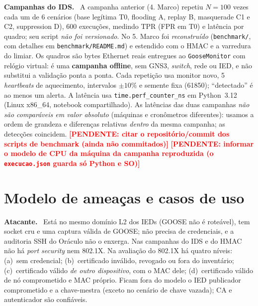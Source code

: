 \documentclass[12pt]{article}
\renewcommand{\paragraph}[1]{\par\noindent\textbf{#1}\ }
\newcommand{\todo}[1]{\textcolor{red}{\textbf{[PENDENTE: #1]}}}
\begin{document}
\paragraph{Campanhas do IDS.} A campanha anterior (4.\textordmasculine{} Marco) repetiu $N=100$ vezes cada um de 6 cen\'arios (base leg\'itima T0, flooding A, replay B, masquerade C1 e C2, suppression D), 600 execu\c{c}\~oes, medindo TPR (FPR em T0) e lat\^encia por quadro; seu script \emph{n\~ao foi versionado}. No 5.\textordmasculine{} Marco foi \emph{reconstru\'ido} (\texttt{benchmark/}, com detalhes em \texttt{benchmark/README.md}) e estendido com o HMAC e a varredura do limiar. Os quadros s\~ao bytes Ethernet reais entregues ao \texttt{GooseMonitor} com rel\'ogio virtual: \'e uma \textbf{campanha offline}, sem GNS3, \emph{switch}, rede ou IED, e n\~ao substitui a valida\c{c}\~ao ponta a ponta. Cada repeti\c{c}\~ao usa monitor novo, 5 \emph{heartbeats} de aquecimento, intervalos $\pm10\%$ e semente fixa (61850); ``detectado'' \'e ao menos um alerta. A lat\^encia usa \texttt{time.perf\_counter\_ns} em Python~3.12 (Linux x86\_64, notebook compartilhado). As lat\^encias das duas campanhas \emph{n\~ao s\~ao compar\'aveis em valor absoluto} (m\'aquinas e cron\^ometros diferentes): usamos a ordem de grandeza e diferen\c{c}as relativas \emph{dentro} da mesma campanha; as detec\c{c}\~oes coincidem. \todo{citar o reposit\'orio/commit dos scripts de benchmark (ainda n\~ao commitados)} \todo{informar o modelo de CPU da m\'aquina da campanha reproduzida (o \texttt{execucao.json} guarda s\'o Python e SO)}


\section{Modelo de amea\c{c}as e casos de uso}\label{sec:ameacas}

\paragraph{Atacante.} Est\'a no mesmo dom\'inio L2 dos IEDs (GOOSE n\~ao \'e rote\'avel), tem socket cru e uma captura v\'alida de GOOSE; n\~ao precisa de credenciais, e a auditoria SSH do Or\'aculo n\~ao o enxerga. Nas campanhas do IDS e do HMAC n\~ao h\'a \emph{port security} nem 802.1X. Na avalia\c{c}\~ao do 802.1X h\'a quatro n\'iveis: (a)~sem credencial; (b)~certificado inv\'alido, revogado ou fora do invent\'ario; (c)~certificado v\'alido \emph{de outro dispositivo}, com o MAC dele; (d)~certificado v\'alido de n\'o comprometido e MAC pr\'oprio. Ficam fora do modelo o IED publicador comprometido e a chave-mestra (exceto no cen\'ario de chave vazada); CA e autenticador s\~ao confi\'aveis.
\end{document}
